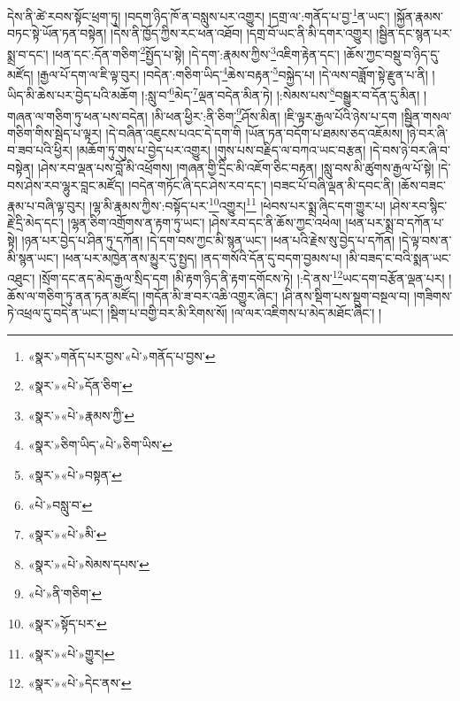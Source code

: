 \documentclass[12pt,a4paper]{book}
\begin{document}
དེས་ནི་ཚེ་རབས་སྟོང་ཕྲག་ཏུ། །བདག་ཉིད་ཁོ་ན་བསླུས་པར་འགྱུར། །དགྲ་ལ་:གནོད་པ་བྱ་\footnote{«སྣར་»གནོད་པར་བྱས་«པེ་»གནོད་པ་བྱས་}ན་ཡང་། །སྐྱོན་རྣམས་བཏང་སྟེ་ཡོན་ཏན་བསྟེན། །དེས་ནི་ཁྱོད་ཀྱིས་རང་ཕན་འཐོབ། །དགྲ་བོ་ཡང་ནི་མི་དགར་འགྱུར། །སྦྱིན་དང་སྙན་པར་སྨྲ་བ་དང་། །ཕན་དང་:དོན་གཅིག་\footnote{«སྣར་»«པེ་»དོན་ཅིག་}སྤྱོད་པ་སྟེ། །དེ་དག་:རྣམས་ཀྱིས་\footnote{«སྣར་»«པེ་»རྣམས་ཀྱི་}འཇིག་རྟེན་དང་། །ཆོས་ཀྱང་བསྡུ་བ་ཉིད་དུ་མཛོད། །རྒྱལ་པོ་དག་ལ་ཇི་ལྟ་བུར། །བདེན་:གཅིག་ཡིད་\footnote{«སྣར་»ཅིག་ཡིད་«པེ་»ཅིག་ཡིས་}ཆེས་བརྟན་\footnote{«སྣར་»«པེ་»བསྟན་}བསྐྱེད་པ། །དེ་ལས་བཟློག་སྟེ་རྫུན་པ་ནི། །ཡིད་མི་ཆེས་པར་བྱེད་པའི་མཆོག །:སླུ་བ་\footnote{«པེ་»བསླུ་བ་}མེད་\footnote{«སྣར་»«པེ་»མི་}ལྡན་བདེན་མིན་ཏེ། །:སེམས་པས་\footnote{«སྣར་»«པེ་»སེམས་དཔས་}བསྒྱུར་བ་དོན་དུ་མིན། །གཞན་ལ་གཅིག་ཏུ་ཕན་པས་བདེན། །མི་ཕན་ཕྱིར་:ནི་ཅིག་\footnote{«པེ་»ནི་གཅིག་}ཤོས་མིན། །ཇི་ལྟར་རྒྱལ་པོའི་ཉེས་པ་དག །སྦྱིན་གསལ་གཅིག་གིས་སྦེད་པ་ལྟར། །དེ་བཞིན་འཇུངས་པའང་དེ་དག་གི །ཡོན་ཏན་བདོག་པ་ཐམས་ཅད་འཇོམས། །ཉེ་བར་ཞི་བ་ཟབ་པའི་ཕྱིར། །མཆོག་ཏུ་གུས་པ་བྱེད་པར་འགྱུར། །གུས་པས་བརྗིད་ལ་བཀའ་ཡང་བརྩན། །དེ་བས་ཉེ་བར་ཞི་བ་བསྟེན། །ཤེས་རབ་ལྡན་པས་བློ་མི་འཕྲོགས། །གཞན་གྱི་དྲིང་མི་འཇོག་ཅིང་བརྟན། །སླུ་བས་མི་ཚུགས་རྒྱལ་པོ་སྟེ། །དེ་བས་ཤེས་རབ་ལྷུར་བླང་མཛོད། །བདེན་གཏོང་ཞི་དང་ཤེས་རབ་དང་། །བཟང་པོ་བཞི་ལྡན་མི་དབང་ནི། །ཆོས་བཟང་རྣམ་པ་བཞི་ལྟ་བུར། །ལྷ་མི་རྣམས་ཀྱིས་:བསྟོད་པར་\footnote{«སྣར་»སྟོད་པར་}འགྱུར།\footnote{«སྣར་»«པེ་»གྱུར།} །ཕེབས་པར་སྨྲ་ཞིང་དག་གྱུར་པ། །ཤེས་རབ་སྙིང་རྗེ་དྲི་མེད་དང་། །ལྷན་ཅིག་འགྲོགས་ན་རྟག་ཏུ་ཡང་། །ཤེས་རབ་དང་ནི་ཆོས་ཀྱང་འཕེལ། །ཕན་པར་སྨྲ་བ་དཀོན་པ་སྟེ། །ཉན་པར་བྱེད་པ་ཤིན་ཏུ་དཀོན། །དེ་དག་བས་ཀྱང་མི་སྙན་ཡང་། །ཕན་པའི་རྗེས་སུ་བྱེད་པ་དཀོན། །དེ་ལྟ་བས་ན་མི་སྙན་ཡང་། །ཕན་པར་མཁྱེན་ནས་མྱུར་དུ་སྤྱད། །ནད་གསོའི་དོན་དུ་བདག་བྱམས་པ། །མི་བཟད་ང་བའི་སྨན་ཡང་འཐུང་། །སྲོག་དང་ནད་མེད་རྒྱལ་སྲིད་དག །མི་རྟག་ཉིད་ནི་རྟག་དགོངས་ཏེ། །:དེ་ནས་\footnote{«སྣར་»«པེ་»དེང་ནས་}ཡང་དག་བརྩོན་ལྡན་པར། །ཆོས་ལ་གཅིག་ཏུ་ནན་ཏན་མཛོད། །གདོན་མི་ཟ་བར་འཆི་འགྱུར་ཞིང་། །ཤི་ནས་སྡིག་པས་སྡུག་བསྔལ་བ། །གཟིགས་ཏེ་འཕྲལ་དུ་བདེ་ན་ཡང་། །སྡིག་པ་བགྱི་བར་མི་རིགས་སོ། །ལ་ལར་འཇིགས་པ་མེད་མཐོང་ཞིང་། །
\end{document}
